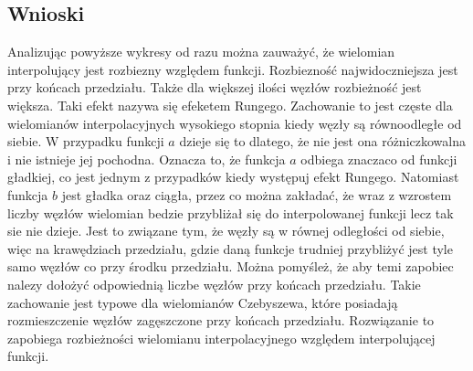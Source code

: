 \documentclass[11pt, a4paper]{article}
\begin{document}
    \subsection{Wnioski}
    Analizując powyższe wykresy od razu można zauważyć, że wielomian interpolujący jest rozbiezny względem funkcji. Rozbiezność najwidoczniejsza jest przy końcach przedziału. Także dla większej ilości węzłów rozbieżność jest większa. Taki efekt nazywa się efeketem Rungego. Zachowanie to jest częste dla wielomianów interpolacyjnych wysokiego stopnia kiedy węzły są równoodległe od siebie. W przypadku funkcji $a$ dzieje się to dlatego, że nie jest ona różniczkowalna i nie istnieje jej pochodna. Oznacza to, że funkcja $a$ odbiega znaczaco od funkcji gładkiej, co jest jednym z przypadków kiedy występuj efekt Rungego. Natomiast funkcja $b$ jest gładka oraz ciągła, przez co można zakładać, że wraz z wzrostem liczby węzłów wielomian bedzie przybliżał się do interpolowanej funkcji lecz tak sie nie dzieje. Jest to związane tym, że węzły są w równej odległości od siebie, więc na krawędziach przedziału, gdzie daną funkcje trudniej przybliżyć jest tyle samo węzłów co przy środku przedziału. Można pomyśleż, że aby temi zapobiec nalezy dołożyć odpowiednią liczbe węzłów przy końcach przedziału. Takie zachowanie jest typowe dla wielomianów Czebyszewa, które posiadają rozmieszczenie węzłów zagęszczone przy końcach przedziału. Rozwiązanie to zapobiega rozbieżności wielomianu interpolacyjnego względem interpolującej funkcji.
\end{document}
